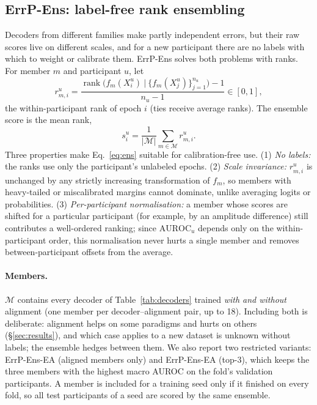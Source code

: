 \subsection{ErrP-Ens: label-free rank ensembling}
\label{sec:ens}
Decoders from different families make partly independent errors, but their raw scores live on different
scales, and for a new participant there are no labels with which to weight or calibrate them. ErrP-Ens solves
both problems with ranks. For member $m$ and participant $u$, let
\begin{equation}
r^u_{m,i}=\frac{\operatorname{rank}\big(f_m(X^u_i)\ \big|\ \{f_m(X^u_j)\}_{j=1}^{n_u}\big)-1}{n_u-1}\in[0,1],
\label{eq:rank}
\end{equation}
the within-participant rank of epoch $i$ (ties receive average ranks). The ensemble score is the mean rank,
\begin{equation}
s^u_i=\frac1{|\mathcal M|}\sum_{m\in\mathcal M} r^u_{m,i}.
\label{eq:ens}
\end{equation}
Three properties make Eq.~\ref{eq:ens} suitable for calibration-free use. (1) \emph{No labels:} the ranks use
only the participant's unlabeled epochs. (2) \emph{Scale invariance:} $r^u_{m,i}$ is unchanged by any strictly
increasing transformation of $f_m$, so members with heavy-tailed or miscalibrated margins cannot dominate,
unlike averaging logits or probabilities. (3) \emph{Per-participant normalisation:} a member whose scores
are shifted for a particular participant (for example, by an amplitude difference) still contributes a
well-ordered ranking; since $\mathrm{AUROC}_u$ depends only on the within-participant order, this
normalisation never hurts a single member and removes between-participant offsets from the average.

\paragraph{Members.} $\mathcal M$ contains every decoder of Table~\ref{tab:decoders} trained \emph{with and
without} alignment (one member per decoder--alignment pair, up to 18). Including both is deliberate:
alignment helps on some paradigms and hurts on others (\S\ref{sec:results}), and which case applies to a new
dataset is unknown without labels; the ensemble hedges between them. We also report two restricted variants:
ErrP-Ens-EA (aligned members only) and ErrP-Ens-EA (top-3), which keeps the three members with the highest
macro AUROC on the fold's validation participants. A member is included for a training seed only if it
finished on every fold, so all test participants of a seed are scored by the same ensemble.


